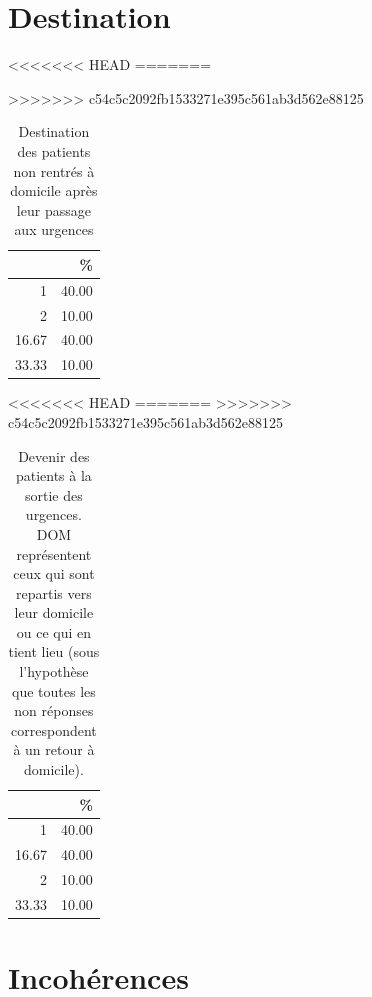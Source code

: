 \documentclass[12pt,english,french,twoside]{book}\usepackage[]{graphicx}\usepackage[]{color}
\makeatletter
\newenvironment{kframe}{%
 \def\at@end@of@kframe{}%
 \ifinner\ifhmode%
  \def\at@end@of@kframe{\end{minipage}}%
  \begin{minipage}{\columnwidth}%
 \fi\fi%
 \def\FrameCommand##1{\hskip\@totalleftmargin \hskip-\fboxsep
 \colorbox{shadecolor}{##1}\hskip-\fboxsep
     \hskip-\linewidth \hskip-\@totalleftmargin \hskip\columnwidth}%
 \MakeFramed {\advance\hsize-\width
   \@totalleftmargin\z@ \linewidth\hsize
   \@setminipage}}%
 {\par\unskip\endMakeFramed%
 \at@end@of@kframe}
\makeatother
\begin{document}
\section{Destination}
<<<<<<< HEAD
=======
\begin{kframe}


{\ttfamily\noindent\bfseries{}}\end{kframe}%
>>>>>>> c54c5c2092fb1533271e395c561ab3d562e88125
\begin{table}[ht]
\centering
\begin{tabular}{rr}
  \hline
 & \% \\ 
  \hline
1 & 40.00 \\ 
  2 & 10.00 \\ 
  16.67 & 40.00 \\ 
  33.33 & 10.00 \\ 
   \hline
\end{tabular}
\caption{Destination des patients non rentrés à domicile après leur passage aux urgences} 
\label{tab.dest.hosp}
\end{table}
<<<<<<< HEAD
=======
>>>>>>> c54c5c2092fb1533271e395c561ab3d562e88125
\begin{table}[ht]
\centering
\begin{tabular}{rr}
  \hline
 & \% \\ 
  \hline
1 & 40.00 \\ 
  16.67 & 40.00 \\ 
  2 & 10.00 \\ 
  33.33 & 10.00 \\ 
   \hline
\end{tabular}
\caption{Devenir des patients à la sortie des urgences. DOM représentent ceux qui sont repartis vers leur domicile ou ce qui en tient lieu (sous l'hypothèse que toutes les non réponses correspondent à un retour à domicile).} 
\label{tab.dest}
\end{table}



\section{Incohérences}
\end{document}
